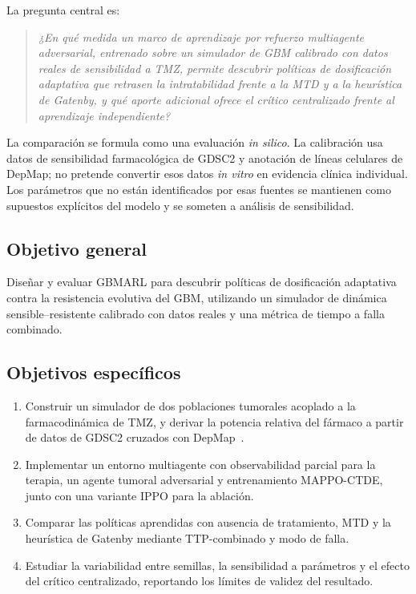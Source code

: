 
La pregunta central es:

\begin{quote}
\emph{¿En qué medida un marco de aprendizaje por refuerzo multiagente adversarial, entrenado sobre un simulador de GBM calibrado con datos reales de sensibilidad a TMZ, permite descubrir políticas de dosificación adaptativa que retrasen la intratabilidad frente a la MTD y a la heurística de Gatenby, y qué aporte adicional ofrece el crítico centralizado frente al aprendizaje independiente?}
\end{quote}

La comparación se formula como una evaluación \emph{in silico}. La calibración usa datos de sensibilidad farmacológica de GDSC2 y anotación de líneas celulares de DepMap; no pretende convertir esos datos \emph{in vitro} en evidencia clínica individual. Los parámetros que no están identificados por esas fuentes se mantienen como supuestos explícitos del modelo y se someten a análisis de sensibilidad.


\subsection*{Objetivo general}

Diseñar y evaluar GBMARL para descubrir políticas de dosificación adaptativa contra la resistencia evolutiva del GBM, utilizando un simulador de dinámica sensible--resistente calibrado con datos reales y una métrica de tiempo a falla combinado.

\subsection*{Objetivos específicos}

\begin{enumerate}
  \item Construir un simulador de dos poblaciones tumorales acoplado a la farmacodinámica de TMZ, y derivar la potencia relativa del fármaco a partir de datos de GDSC2 cruzados con DepMap~\cite{GDSC,DepMap}.
  \item Implementar un entorno multiagente con observabilidad parcial para la terapia, un agente tumoral adversarial y entrenamiento MAPPO-CTDE, junto con una variante IPPO para la ablación.
  \item Comparar las políticas aprendidas con ausencia de tratamiento, MTD y la heurística de Gatenby mediante TTP-combinado y modo de falla.
  \item Estudiar la variabilidad entre semillas, la sensibilidad a parámetros y el efecto del crítico centralizado, reportando los límites de validez del resultado.
\end{enumerate}

